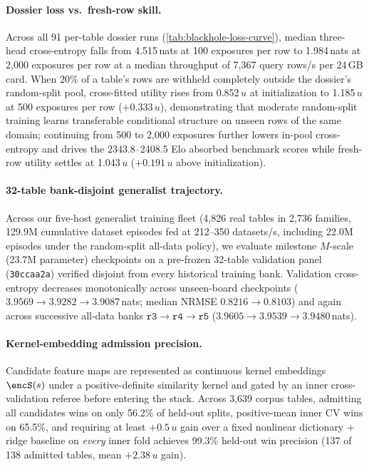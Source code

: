 \paragraph{Dossier loss vs.\ fresh-row skill.}
Across all 91 per-table dossier runs (\cref{tab:blackhole-loss-curve}), median three-head cross-entropy falls from
4.515\,nats at 100 exposures per row to 1.984\,nats at 2,000 exposures per row at a median throughput of 7,367 query
rows/s per 24\,GB card. When 20\% of a table's rows are withheld completely outside the dossier's random-split pool,
cross-fitted utility rises from 0.852\,$u$ at initialization to 1.185\,$u$ at 500 exposures per row ($+0.333\,u$),
demonstrating that moderate random-split training learns transferable conditional structure on unseen rows of the same
domain; continuing from 500 to 2,000 exposures further lowers in-pool cross-entropy and drives the 2343.8--2408.5 Elo
absorbed benchmark scores while fresh-row utility settles at 1.043\,$u$ ($+0.191\,u$ above initialization).

\paragraph{32-table bank-disjoint generalist trajectory.}
Across our five-host generalist training fleet (4,826 real tables in 2,736 families, 129.9M cumulative dataset episodes
fed at 212--350 datasets/s, including 22.0M episodes under the random-split all-data policy), we evaluate milestone
$M$-scale (23.7M parameter) checkpoints on a pre-frozen 32-table validation panel (\texttt{30ccaa2a}) verified disjoint
from every historical training bank. Validation cross-entropy decreases monotonically across unseen-board checkpoints
($3.9569 \to 3.9282 \to 3.9087$\,nats; median NRMSE $0.8216 \to 0.8103$) and again across successive all-data banks
$\texttt{r3} \to \texttt{r4} \to \texttt{r5}$ ($3.9605 \to 3.9539 \to 3.9480$\,nats).

\paragraph{Kernel-embedding admission precision.}
Candidate feature maps are represented as continuous kernel embeddings $\encS(s)$ under a positive-definite similarity
kernel and gated by an inner cross-validation referee before entering the stack. Across 3,639 corpus tables, admitting
all candidates wins on only 56.2\% of held-out splits, positive-mean inner CV wins on 65.5\%, and requiring at least
$+0.5\,u$ gain over a fixed nonlinear dictionary + ridge baseline on \emph{every} inner fold achieves 99.3\% held-out
win precision (137 of 138 admitted tables, mean $+2.38\,u$ gain).
